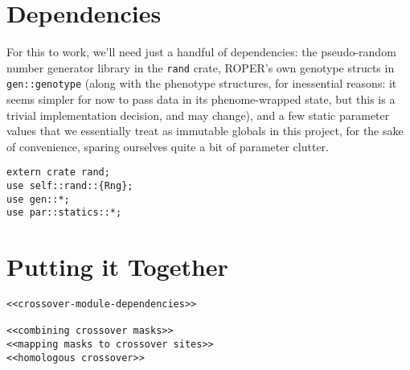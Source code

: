 \documentclass[11pt]{article}
\begin{document}
\section{Dependencies}
\label{sec:org5bc43c0}

For this to work, we'll need just a handful of dependencies: the pseudo-random
number generator library in the \texttt{rand} crate, ROPER's own genotype structs in
\texttt{gen::genotype} (along with the phenotype structures, for inessential reasons:
it seems simpler for now to pass data in its phenome-wrapped state, but this is
a trivial implementation decision, and may change), and a few static parameter
values that we essentially treat as immutable globals in this project, for
the sake of convenience, sparing ourselves quite a bit of parameter clutter.

\lstset{language=rust,label=org8930e9a,caption= ,captionpos=b,numbers=none}
\begin{lstlisting}
extern crate rand;
use self::rand::{Rng};
use gen::*;
use par::statics::*;
\end{lstlisting}


\section{Putting it Together}
\label{sec:org4a3d9c6}
\lstset{language=rust,label=org138f016,caption= ,captionpos=b,numbers=none}
\begin{lstlisting}
<<crossover-module-dependencies>>

<<combining crossover masks>>
<<mapping masks to crossover sites>>
<<homologous crossover>>
\end{lstlisting}
\end{document}
